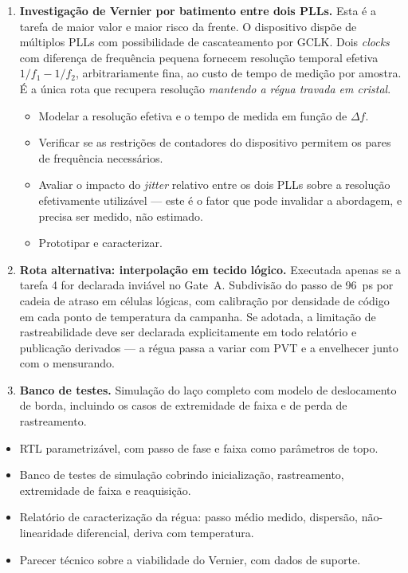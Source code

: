 \documentclass[11pt,a4paper]{article}
\newcommand{\campo}[1]{\vspace{6pt}\noindent{\bfseries\color{lescgray}#1}\par\vspace{2pt}}
\begin{document}
\begin{enumerate}
  \item \textbf{Investigação de Vernier por batimento entre dois PLLs.}
        Esta é a tarefa de maior valor e maior risco da frente. O dispositivo dispõe de
        múltiplos PLLs com possibilidade de cascateamento por GCLK. Dois \emph{clocks}
        com diferença de frequência pequena fornecem resolução temporal efetiva
        $1/f_1 - 1/f_2$, arbitrariamente fina, ao custo de tempo de medição por amostra.
        É a única rota que recupera resolução \emph{mantendo a régua travada em cristal}.
        \begin{itemize}
          \item Modelar a resolução efetiva e o tempo de medida em função de $\Delta f$.
          \item Verificar se as restrições de contadores do dispositivo permitem os
                pares de frequência necessários.
          \item Avaliar o impacto do \emph{jitter} relativo entre os dois PLLs sobre a
                resolução efetivamente utilizável --- este é o fator que pode invalidar
                a abordagem, e precisa ser medido, não estimado.
          \item Prototipar e caracterizar.
        \end{itemize}

  \item \textbf{Rota alternativa: interpolação em tecido lógico.}
        Executada apenas se a tarefa 4 for declarada inviável no Gate~A. Subdivisão do
        passo de \SI{96}{\pico\second} por cadeia de atraso em células lógicas, com
        calibração por densidade de código em cada ponto de temperatura da campanha.
        Se adotada, a limitação de rastreabilidade deve ser declarada explicitamente
        em todo relatório e publicação derivados --- a régua passa a variar com PVT
        e a envelhecer junto com o mensurando.

  \item \textbf{Banco de testes.}
        Simulação do laço completo com modelo de deslocamento de borda, incluindo os
        casos de extremidade de faixa e de perda de rastreamento.
\end{enumerate}

\campo{Entregáveis}
\begin{itemize}
  \item RTL parametrizável, com passo de fase e faixa como parâmetros de topo.
  \item Banco de testes de simulação cobrindo inicialização, rastreamento, extremidade
        de faixa e reaquisição.
  \item Relatório de caracterização da régua: passo médio medido, dispersão,
        não-linearidade diferencial, deriva com temperatura.
  \item Parecer técnico sobre a viabilidade do Vernier, com dados de suporte.
\end{itemize}
\end{document}
